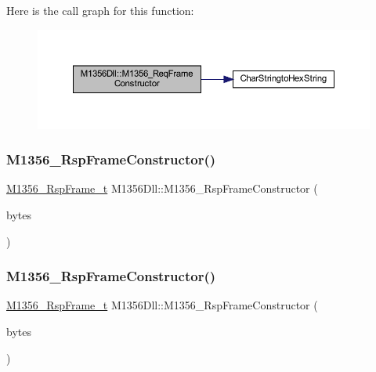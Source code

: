 Here is the call graph for this function\+:
\nopagebreak
\begin{figure}[H]
\begin{center}
\leavevmode
\includegraphics[width=350pt]{class_m1356_dll_a44099cd5f4bbdf9f37507eb7fa5477d6_cgraph}
\end{center}
\end{figure}
\mbox{\label{class_m1356_dll_a40131e8263bd201208a37ec1826d5310}} 
\subsubsection{\texorpdfstring{M1356\_RspFrameConstructor()}{M1356\_RspFrameConstructor()}\hspace{0.1cm}{\footnotesize\ttfamily [1/2]}}
{\footnotesize\ttfamily \mbox{\hyperlink{struct_m1356___rsp_frame__t}{M1356\+\_\+\+Rsp\+Frame\+\_\+t}} M1356\+Dll\+::\+M1356\+\_\+\+Rsp\+Frame\+Constructor (\begin{DoxyParamCaption}\item[{Q\+Byte\+Array}]{bytes }\end{DoxyParamCaption})}

\mbox{\label{class_m1356_dll_a40131e8263bd201208a37ec1826d5310}} 
\subsubsection{\texorpdfstring{M1356\_RspFrameConstructor()}{M1356\_RspFrameConstructor()}\hspace{0.1cm}{\footnotesize\ttfamily [2/2]}}
{\footnotesize\ttfamily \mbox{\hyperlink{struct_m1356___rsp_frame__t}{M1356\+\_\+\+Rsp\+Frame\+\_\+t}} M1356\+Dll\+::\+M1356\+\_\+\+Rsp\+Frame\+Constructor (\begin{DoxyParamCaption}\item[{Q\+Byte\+Array}]{bytes }\end{DoxyParamCaption})}

